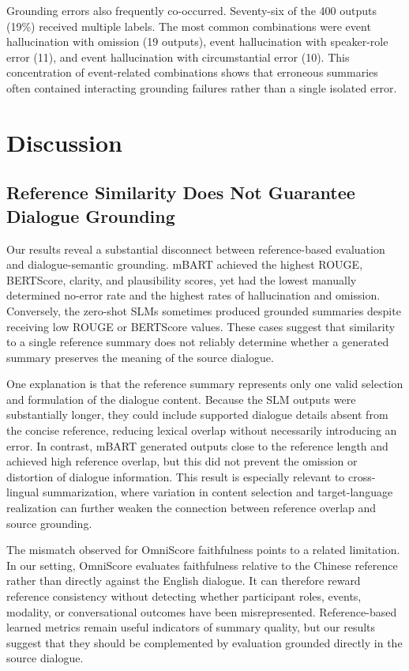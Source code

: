 \documentclass[11pt]{article}
\begin{document}
Grounding errors also frequently co-occurred. Seventy-six of the 400 outputs (19\%) received multiple labels. The most common combinations were event hallucination with omission (19 outputs), event hallucination with speaker-role error (11), and event hallucination with circumstantial error (10). This concentration of event-related combinations shows that erroneous summaries often contained interacting grounding failures rather than a single isolated error.

\FloatBarrier

\section{Discussion}

\subsection{Reference Similarity Does Not Guarantee Dialogue Grounding}

Our results reveal a substantial disconnect between reference-based evaluation and dialogue-semantic grounding. mBART achieved the highest ROUGE, BERTScore, clarity, and plausibility scores, yet had the lowest manually determined no-error rate and the highest rates of hallucination and omission. Conversely, the zero-shot SLMs sometimes produced grounded summaries despite receiving low ROUGE or BERTScore values. These cases suggest that similarity to a single reference summary does not reliably determine whether a generated summary preserves the meaning of the source dialogue.

One explanation is that the reference summary represents only one valid selection and formulation of the dialogue content. Because the SLM outputs were substantially longer, they could include supported dialogue details absent from the concise reference, reducing lexical overlap without necessarily introducing an error. In contrast, mBART generated outputs close to the reference length and achieved high reference overlap, but this did not prevent the omission or distortion of dialogue information. This result is especially relevant to cross-lingual summarization, where variation in content selection and target-language realization can further weaken the connection between reference overlap and source grounding.

The mismatch observed for OmniScore faithfulness points to a related limitation. In our setting, OmniScore evaluates faithfulness relative to the Chinese reference rather than directly against the English dialogue. It can therefore reward reference consistency without detecting whether participant roles, events, modality, or conversational outcomes have been misrepresented. Reference-based learned metrics remain useful indicators of summary quality, but our results suggest that they should be complemented by evaluation grounded directly in the source dialogue.
\end{document}
